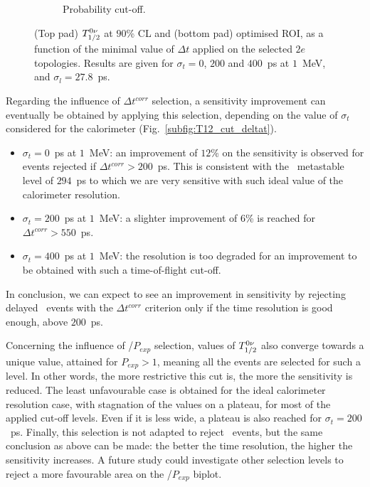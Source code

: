 \begin{figure}[!h]
\begin{subfigure}[t]{1\textwidth}
  \captionsetup{justification=justified}
  \caption{Probability cut-off.
    \label{subfig:T12_cut_proba}}
\end{subfigure}
\caption{(Top pad) $T_{1/2}^{0\nu}$ at $90$\% CL and (bottom pad) optimised ROI, as a function of the minimal value of $\Delta t$ applied on the selected $2e$ topologies.
    Results are given for $\sigma_{t}=0$, $200$ and $400$~ps at $1$~MeV, and $\sigma_{l}=27.8$~ps.
  \label{fig:T12_cut}}
\end{figure}

Regarding the influence of $\Delta t^{corr}$ selection, a sensitivity improvement can eventually be obtained by applying this selection, depending on the value of $\sigma_{t}$ considered for the calorimeter (Fig.~\ref{subfig:T12_cut_deltat}).
\begin{itemize}
\item $\sigma_{t}=0$~ps at $1$~MeV: an improvement of $12$\% on the sensitivity is observed for events rejected if $\Delta t^{corr}>200$~ps.
  This is consistent with the \Pb\ metastable level of $294$~ps to which we are very sensitive with such ideal value of the calorimeter resolution.
\item $\sigma_{t}=200$~ps at $1$~MeV: a slighter improvement of $6$\% is reached for $\Delta t^{corr}>550$~ps.
\item $\sigma_{t}=400$~ps at $1$~MeV: the resolution is too degraded for an improvement to be obtained with such a time-of-flight cut-off.
\end{itemize}
In conclusion, we can expect to see an improvement in sensitivity by rejecting delayed \Tl\ events with the $\Delta t^{corr}$ criterion only if the time resolution is good enough, above $200$~ps.

Concerning the influence of \Pint/$P_{exp}$ selection, values of $T_{1/2}^{0\nu}$ also converge towards a unique value, attained for $P_{exp}>1$, meaning all the events are selected for such a level.
In other words, the more restrictive this cut is, the more the sensitivity is reduced.
The least unfavourable case is obtained for the ideal calorimeter resolution case, with stagnation of the values on a plateau, for most of the applied cut-off levels.
Even if it is less wide, a plateau is also reached for $\sigma_{t}=200$~ps.
Finally, this selection is not adapted to reject \Tl\ events, but the same conclusion as above can be made: the better the time resolution, the higher the sensitivity increases.
A future study could investigate other selection levels to reject a more favourable area on the \Pint/$P_{exp}$ biplot.

